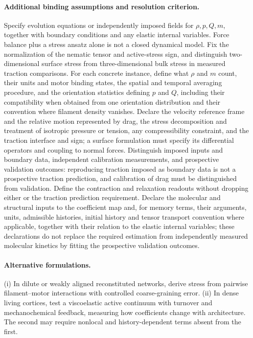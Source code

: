 \documentclass[11pt]{article}
\begin{document}
\paragraph{Additional binding assumptions and resolution criterion.} Specify evolution equations or independently imposed fields for $\rho,p,Q,m$, together with boundary conditions and any elastic internal variables. Force balance plus a stress ansatz alone is not a closed dynamical model. Fix the normalization of the nematic tensor and active-stress sign, and distinguish two-dimensional surface stress from three-dimensional bulk stress in measured traction comparisons. For each concrete instance, define what $\rho$ and $m$ count, their units and motor binding states, the spatial and temporal averaging procedure, and the orientation statistics defining $p$ and $Q$, including their compatibility when obtained from one orientation distribution and their convention where filament density vanishes. Declare the velocity reference frame and the relative motion represented by drag, the stress decomposition and treatment of isotropic pressure or tension, any compressibility constraint, and the traction interface and sign; a surface formulation must specify its differential operators and coupling to normal forces. Distinguish imposed inputs and boundary data, independent calibration measurements, and prospective validation outcomes: reproducing traction imposed as boundary data is not a prospective traction prediction, and calibration of drag must be distinguished from validation. Define the contraction and relaxation readouts without dropping either or the traction prediction requirement. Declare the molecular and structural inputs to the coefficient map and, for memory terms, their arguments, units, admissible histories, initial history and tensor transport convention where applicable, together with their relation to the elastic internal variables; these declarations do not replace the required estimation from independently measured molecular kinetics by fitting the prospective validation outcomes.

\paragraph{Alternative formulations.} (i) In dilute or weakly aligned reconstituted networks, derive stress from pairwise filament--motor interactions with controlled coarse-graining error. (ii) In dense living cortices, test a viscoelastic active continuum with turnover and mechanochemical feedback, measuring how coefficients change with architecture. The second may require nonlocal and history-dependent terms absent from the first.
\end{document}
